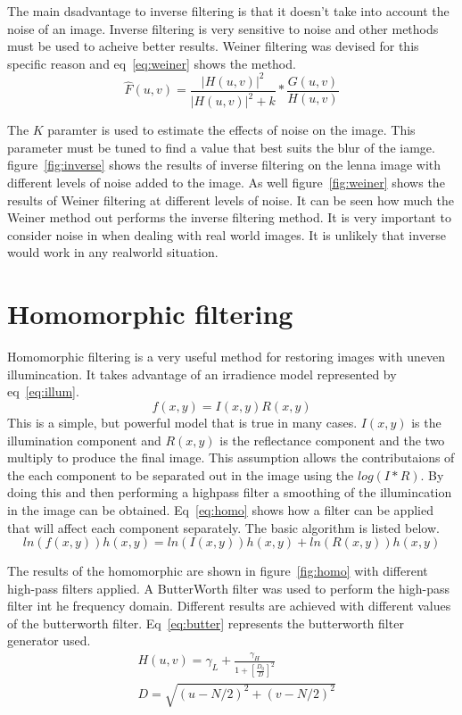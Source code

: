 \documentclass[letterpaper]{article}
\begin{document}
The main dsadvantage to inverse filtering is that it doesn't take into account the noise of an image. Inverse filtering is very sensitive to noise and other methods must be used to acheive better results. Weiner filtering was devised for this specific reason and eq~\ref{eq:weiner} shows the method. 
\begin{equation} \label{eq:weiner}
\hat{F}(u,v)=\frac{|H(u,v)|^2}{|H(u,v)|^2 +k} * \frac{G(u,v)}{H(u,v)}
\end{equation}

The $K$ paramter is used to estimate the effects of noise on the image. This parameter must be tuned to find a value that best suits the blur of the iamge. figure~\ref{fig:inverse} shows the results of inverse filtering on the lenna image with different levels of noise added to the image. As well figure~\ref{fig:weiner} shows the results of Weiner filtering at different levels of noise. It can be seen how much the Weiner method out performs the inverse filtering method. It is very important to consider noise in when dealing with real world images. It is unlikely that inverse would work in any realworld situation.
\section{Homomorphic filtering}
Homomorphic filtering is a very useful method for restoring images with uneven illumincation. It takes advantage of an irradience model represented by eq~\ref{eq:illum}.
\begin{equation} \label{eq:illum}
f(x,y)=I(x,y)R(x,y)
\end{equation}
This is a simple, but powerful model that is true in many cases. $I(x,y)$ is the illumination component and $R(x,y)$ is the reflectance component and the two multiply to produce the final image. This assumption allows the contributaions of the each component to be separated out in the image using the $log(I*R)$. By doing this and then performing a highpass filter a smoothing of the illumincation in the image can be obtained. Eq~\ref{eq:homo} shows how a filter can be applied that will affect each component separately. The basic algorithm is listed below.
\begin{equation} \label{eq:homo}
ln(f(x,y))h(x,y)=ln(I(x,y))h(x,y) +ln(R(x,y))h(x,y)
\end{equation}


The results of the homomorphic are shown in figure~\ref{fig:homo} with different high-pass filters applied. A ButterWorth filter was used to perform the high-pass filter int he frequency domain. Different results are achieved with different values of the butterworth filter. Eq~\ref{eq:butter} represents the butterworth filter generator used.
\begin{align} \label{eq:butter}
&H(u,v)=\gamma_{L}+\frac{\gamma_{H}}{1 + [\frac{D_{0}}{D}]^2} \\
& D = \sqrt{(u-N/2)^2+(v-N/2)^2} \nonumber
\end{align}

  
\end{document}
